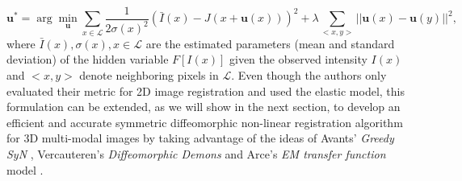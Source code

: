 \begin{equation}\label{eq:arce_elastic}
    \mathbf{u}^{*} = \arg \min_{\mathbf{u}} \sum_{x \in \mathcal{L}} \frac{1}{2 \sigma(x)^{2}} ( \bar{I}(x) - J(x + \mathbf{u}(x)))^{2} + \lambda \sum_{<x, y>} ||\mathbf{u}(x) - \mathbf{u}(y)||^{2},
\end{equation}
where $\bar{I}(x), \sigma(x), x\in \mathcal{L}$ are the estimated parameters (mean and standard deviation) of the hidden variable $F[I(x)]$ given the
observed intensity $I(x)$ and $<x, y>$ denote neighboring pixels in $\mathcal{L}$. Even though the authors only evaluated their metric for 2D image registration and used
the elastic model, this formulation can be extended, as we will show in the next section, to develop an efficient and accurate symmetric diffeomorphic non-linear registration algorithm for 3D multi-modal images by taking advantage of the ideas of Avants' \textit{Greedy SyN} \citep{Avants2008}, Vercauteren's \textit{Diffeomorphic Demons} \citep{Vercauteren2009} and Arce's \textit{EM transfer function} model \citep{Arce-santana2014}.
